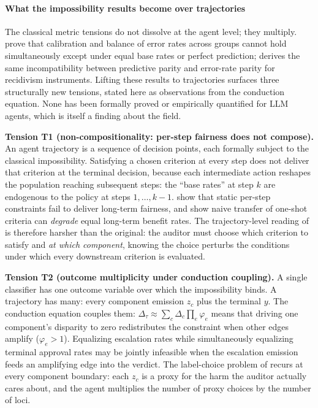 \documentclass[acmsmall,nonacm]{acmart}
\begin{document}
\paragraph{What the impossibility results become over trajectories}

The classical metric tensions do not dissolve at the agent level; they multiply. \cite{kleinberg2017inherent} prove that calibration and balance of error rates across groups cannot hold simultaneously except under equal base rates or perfect prediction; \cite{chouldechova2017fair} derives the same incompatibility between predictive parity and error-rate parity for recidivism instruments. Lifting these results to trajectories surfaces three structurally new tensions, stated here as observations from the conduction equation. None has been formally proved or empirically quantified for LLM agents, which is itself a finding about the field.

\textbf{Tension T1 (non-compositionality: per-step fairness does not compose).} An agent trajectory is a sequence of decision points, each formally subject to the classical impossibility. Satisfying a chosen criterion at every step does not deliver that criterion at the terminal decision, because each intermediate action reshapes the population reaching subsequent steps: the ``base rates'' at step $k$ are endogenous to the policy at steps $1, \dots, k-1$. \cite{hu2022achieving} show that static per-step constraints fail to deliver long-term fairness, and \cite{xu2024adapting} show naive transfer of one-shot criteria can \emph{degrade} equal long-term benefit rates. The trajectory-level reading of \cite{kleinberg2017inherent} is therefore harsher than the original: the auditor must choose which criterion to satisfy and \emph{at which component}, knowing the choice perturbs the conditions under which every downstream criterion is evaluated.

\textbf{Tension T2 (outcome multiplicity under conduction coupling).} A single classifier has one outcome variable over which the impossibility binds. A trajectory has many: every component emission $z_c$ plus the terminal $y$. The conduction equation couples them: $\Delta_\tau \approx \sum_c \Delta_c \prod_e \varphi_e$ means that driving one component's disparity to zero redistributes the constraint when other edges amplify ($\varphi_e > 1$). Equalizing escalation rates while simultaneously equalizing terminal approval rates may be jointly infeasible when the escalation emission feeds an amplifying edge into the verdict. The label-choice problem of \cite{obermeyer2019dissecting} recurs at every component boundary: each $z_c$ is a proxy for the harm the auditor actually cares about, and the agent multiplies the number of proxy choices by the number of loci.
\end{document}
